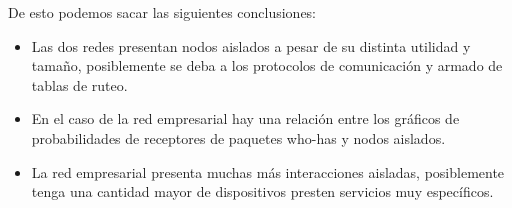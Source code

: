 De esto podemos sacar las siguientes conclusiones:
\begin{itemize}
\item Las dos redes presentan nodos aislados a pesar de su distinta utilidad y tamaño, posiblemente se deba a los protocolos de comunicación y armado de tablas de ruteo. 
\item En el caso de la red empresarial hay una relación entre los gráficos de probabilidades de receptores de paquetes who-has y nodos aislados. 
\item La red empresarial presenta muchas más interacciones aisladas, posiblemente tenga una cantidad mayor de dispositivos presten servicios muy específicos.

\end{itemize}

 



 
